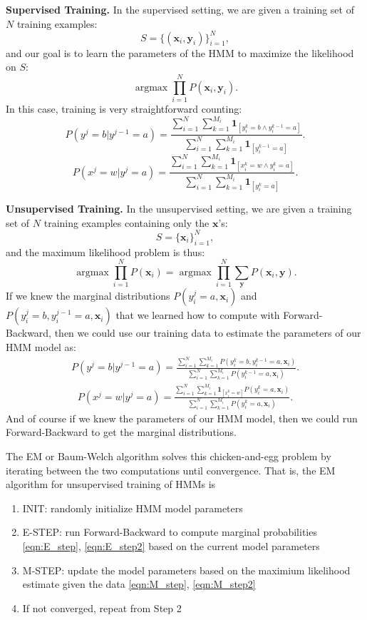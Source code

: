 \documentclass{article}
\DeclareMathOperator{\argmax}{argmax}
\newcommand{\x}{\textbf{x}}
\newcommand{\y}{\textbf{y}}
\begin{document}
\textbf{Supervised Training.}
In the supervised setting, we are given a training set of $N$ training examples:  
$$S = \{(\x_i,\y_i)\}_{i=1}^N,$$
and our goal is to learn the parameters of the HMM to maximize the likelihood on $S$:
$$\argmax \prod_{i=1}^N P(\x_i,\y_i).$$
In this case, training is very straightforward counting:
$$P(y^j=b|y^{j-1}=a) = \frac{\sum_{i=1}^N\sum_{k=1}^{M_i} \textbf{1}_{[y_i^k=b \wedge y_i^{k-1} = a]}}{\sum_{i=1}^N\sum_{k=1}^{M_i} \textbf{1}_{[y_i^{k-1} = a]}}.$$
$$P(x^j=w|y^{j}=a) = \frac{\sum_{i=1}^N\sum_{k=1}^{M_i} \textbf{1}_{[x_i^k=w \wedge y_i^{k} = a]}}{\sum_{i=1}^N\sum_{k=1}^{M_i} \textbf{1}_{[y_i^{k} = a]}}.$$

\textbf{Unsupervised Training.}
In the unsupervised setting, we are given a training set of $N$ training examples  containing only the $\x$'s:
$$S = \{\x_i\}_{i=1}^N,$$
and the maximum likelihood problem is thus:
$$\argmax \prod_{i=1}^N P(\x_i)=\argmax \prod_{i=1}^N \sum_\y P(\x_i,\y).$$
If we knew the marginal distributions $P( y_i^{j} = a,\x_i)$ and $P(y_i^j=b ,y_i^{j-1} = a, \x_i)$ that we learned how to compute with Forward-Backward, then we could use our training data to estimate the parameters of our HMM model as:
\begin{eqnarray}P(y^j=b|y^{j-1}=a) = \frac{\sum_{i=1}^N\sum_{k=1}^{M_i} P(y_i^k=b ,y_i^{k-1} = a, \x_i)}{\sum_{i=1}^N\sum_{k=1}^{M_i} P(y_i^{k-1}=a,\x_i)}.\label{eqn:M_step}\end{eqnarray}
\begin{eqnarray}P(x^j=w|y^{j}=a) = \frac{\sum_{i=1}^N\sum_{k=1}^{M_i} \textbf{1}_{[x_i^k=w]} P( y_i^{k} = a,\x_i)}{\sum_{i=1}^N\sum_{k=1}^{M_i} P(y_i^{k} = a,\x_i)}.\label{eqn:M_step2}\end{eqnarray}
And of course if we knew the parameters of our HMM model, then we could run Forward-Backward to get the marginal distributions.

The EM or Baum-Welch algorithm solves this chicken-and-egg problem by iterating between the two computations until convergence.  That is, the EM algorithm for unsupervised training of HMMs is
\begin{enumerate}
\item INIT: randomly initialize HMM model parameters
\item E-STEP: run Forward-Backward to compute marginal probabilities \eqref{eqn:E_step}, \eqref{eqn:E_step2} based on the current model parameters
\item M-STEP: update the model parameters based on the maximium likelihood estimate given the data \eqref{eqn:M_step}, \eqref{eqn:M_step2}
\item If not converged, repeat from Step 2
\end{enumerate}
\end{document}
